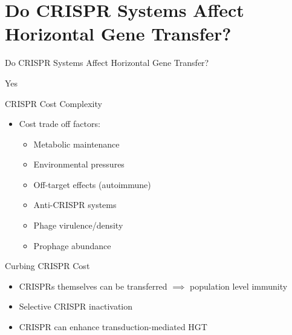 \documentclass[dvipsnames]{beamer}
\begin{document}
\section{Do CRISPR Systems Affect Horizontal Gene Transfer?}
\begin{frame}{}
    \begin{center}
        \Huge \textcolor{OliveGreen}{Do CRISPR Systems Affect Horizontal Gene Transfer?}
    \end{center}
    \addtocounter{framenumber}{-1}
\end{frame}
\begin{frame}[fragile]{}
    \begin{center}
        \Huge Yes
    \end{center}
\end{frame}
\begin{frame}[fragile]{CRISPR Cost Complexity}
    \begin{itemize}
        \item<2-> Cost trade off factors:
        \begin{itemize}
            \item<3-> Metabolic maintenance \autocite{crispgen}
            \item<4-> Environmental pressures \autocite{hospital}
            \item<5-> Off-target effects (autoimmune) \autocite{selfcrisp}
            \item<6-> Anti-CRISPR systems \autocite{acqorres}
            \item<7-> Phage virulence/density \autocite{acqorres}
            \item<8-> Prophage abundance \autocite{transhgt}
        \end{itemize}
    \end{itemize}
\end{frame}
\begin{frame}[fragile]{Curbing CRISPR Cost}
    \begin{itemize}
        \item<2-> CRISPRs themselves can be transferred $\implies$ population level immunity \autocite{crisprlgt}
        \item<3-> Selective CRISPR inactivation \autocite{crispgen}
        \item<4-> CRISPR can enhance transduction-mediated HGT \autocite{transhgt}
    \end{itemize}
\end{frame}
\end{document}
